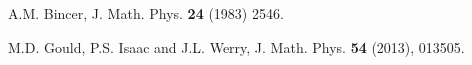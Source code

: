 \documentclass[12pt]{article}
\begin{document}
%
%
%
%
%
%
%
%
\newpage
\begin{thebibliography}{10}
 A.M. Bincer, J. Math. Phys. {\bf 24} (1983) 2546.



% 
 M.D. Gould, P.S. Isaac and J.L. Werry, J. Math. Phys. {\bf 54} (2013), 013505.
% 
% 
%  
%  
% 
  

 
  

\end{thebibliography}
\end{document}
